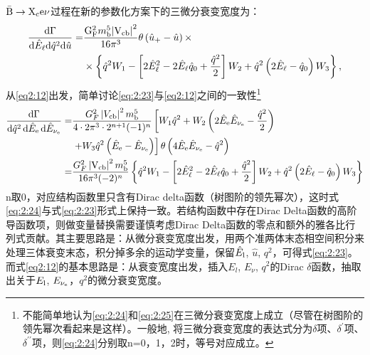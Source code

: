     $\mathrm{\bar{B}\to X_{c}e\nu}$过程在新的参数化方案下的三微分衰变宽度为： 
    \begin{equation}
    \begin{aligned}
    \frac{\mathrm{d} \Gamma}{\mathrm{d} \hat{E}_{\mathrm{\ell}} \mathrm{d} \hat{q}^2 \mathrm{d} \hat{u}}= & \frac{\mathrm{G_F^2} m_{\mathrm{b}}^5\mathrm{\left|V_{c b}\right|^2}}{16 \pi^3} \theta\left(\hat{u}_{+}-\hat{u}\right) \times \\
    & \times\left\{\hat{q}^2 W_1-\left[2 \hat{E}_{\mathrm{\ell}}^2-2 \hat{E}_{\mathrm{\ell}} \hat{q}_0+\frac{\hat{q}^2}{2}\right] W_2+\hat{q}^2\left(2 \hat{E}_{\mathrm{\ell}}-\hat{q}_0\right) W_3\right\},
    \end{aligned}
    \label{eq:2:23}
    \end{equation}
    从\ref{eq2:12}出发，简单讨论\ref{eq:2:23}与\ref{eq2:12}之间的一致性\footnote{不能简单地认为\ref{eq:2:24}和\ref{eq:2:25}在三微分衰变宽度上成立（尽管在树图阶的领先幂次看起来是这样）。一般地, 将三微分衰变宽度的表达式分为$\delta$项、$\delta^{\prime}$项、$\delta^{\prime\prime}$项，则\ref{eq:2:24}分别取n=0，1，2时，等号对应成立。}
    \begin{equation}
        \begin{aligned}
    \frac{\mathrm{d} \Gamma}{\mathrm{d} \hat{q}^2 \, \mathrm{d} \hat{E}_{\mathrm{e}} \, \mathrm{d} \hat{E}_{\mathrm{\nu_e}}} = & \frac{G_F^2 \left| V_{\mathrm{c b}} \right|^2 m_{\mathrm{b}}^5}{4 \cdot 2 \pi^3 \cdot 2^{n+1} (-1)^n} \left[ W_1 \hat{q}^2 + W_2 \left( 2 \hat{E}_{\mathrm{e}} \hat{E}_{\mathrm{\nu_e}} - \frac{\hat{q}^2}{2} \right) \right. \\
    & \left. + W_3 \hat{q}^2 \left( \hat{E}_{\mathrm{e}} - \hat{E}_{\mathrm{\nu_e}} \right) \right] \theta \left( 4 \hat{E}_{\mathrm{e}} \hat{E}_{\mathrm{\nu_e}} - \hat{q}^2 \right) \\
    = & \frac{G_F^2 \left| \mathrm{V_{\mathrm{c b}}} \right|^2 m_{\mathrm{b}}^5}{16 \pi^3 (-2)^n} \left\{ \hat{q}^2 W_1 - \left[ 2 \hat{E}_{\ell}^2 - 2 \hat{E}_{\ell} \hat{q}_0 + \frac{\hat{q}^2}{2} \right] W_2 + \hat{q}^2 \left( 2 \hat{E}_{\ell} - \hat{q}_0 \right) W_3 \right\}
    \end{aligned}
    \label{eq:2:24}
\end{equation}
    n取0，对应结构函数里只含有Dirac delta函数（树图阶的领先幂次），这时式\eqref{eq:2:24}与式\eqref{eq:2:23}形式上保持一致。若结构函数中存在Dirac Delta函数的高阶导函数项，则做变量替换需要谨慎考虑Dirac Delta函数的零点和额外的雅各比行列式贡献。其主要思路是：从微分衰变宽度出发，用两个准两体末态相空间积分来处理三体衰变末态，积分掉多余的运动学变量，保留$\hat{E}_{\mathrm{l}}$, $\hat{u}$, $q^{2}$，可得式\eqref{eq:2:23}。而式\eqref{eq2:12}的基本思路是：从衰变宽度出发，插入$E_{l}$, $E_{\nu}$, $q^{2}$的Dirac $\delta$函数，抽取出关于$E_{\mathrm{l}}$,  $E_{\mathrm{\nu_e}}$，$q^{2}$的微分衰变宽度。

